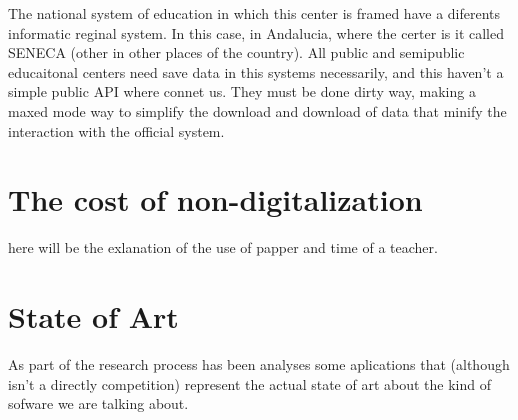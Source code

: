 \documentclass[oneside,english,titlepage]{scrbook}
\begin{document}
The national system of education in which this center is framed have a diferents informatic reginal system. In this case, in Andalucia, where the certer is it called SENECA (other in other places of the country). All public and semipublic educaitonal centers need save data in this systems necessarily, and this haven't a simple public API where connet us. They must be done dirty way, making a maxed mode way to simplify the download and download of data that minify the interaction with the official system.


\section{The cost of non-digitalization}

here will be the exlanation of the use of papper and time of a teacher.

\section{State of Art }

As part of the research process has been analyses some aplications
that (although isn't a directly competition) represent the actual
state of art about the kind of sofware we are talking about.
\end{document}
